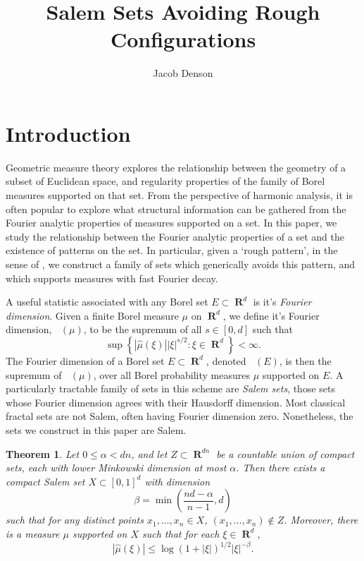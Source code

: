 \documentclass[12pt,reqno]{article}
\title{Salem Sets Avoiding Rough Configurations}
\author{Jacob Denson}
\numberwithin{equation}{section}
\DeclareMathOperator{\fordim}{\dim_{\mathbf{F}}}
\DeclareMathOperator{\RR}{\mathbf{R}}
\newtheorem{theorem}{Theorem}
\begin{document}
\maketitle

\section{Introduction}

Geometric measure theory explores the relationship between the geometry of a subset of Euclidean space, and regularity properties of the family of Borel measures supported on that set. From the perspective of harmonic analysis, it is often popular to explore what structural information can be gathered from the Fourier analytic properties of measures supported on a set. In this paper, we study the relationship between the Fourier analytic properties of a set and the existence of patterns on the set. In particular, given a `rough pattern', in the sense of \cite{OurPaper}, we construct a family of sets which generically avoids this pattern, and which supports measures with fast Fourier decay.

A useful statistic associated with any Borel set $E \subset \RR^d$ is it's \emph{Fourier dimension}. Given a finite Borel measure $\mu$ on $\RR^d$, we define it's Fourier dimension, $\fordim(\mu)$, to be the supremum of all $s \in [0,d]$ such that
%
\begin{equation} \label{fordim}
    \sup \left\{ |\widehat{\mu}(\xi)| |\xi|^{s/2} : \xi \in \RR^d \right\} < \infty.
\end{equation}
%
The Fourier dimension of a Borel set $E \subset \RR^d$, denoted $\fordim(E)$, is then the supremum of $\fordim(\mu)$, over all Borel probability measures $\mu$ supported on $E$. A particularly tractable family of sets in this scheme are \emph{Salem sets}, those sets whose Fourier dimension agrees with their Hausdorff dimension. Most classical fractal sets are not Salem, often having Fourier dimension zero. Nonetheless, the sets we construct in this paper are Salem.

\begin{theorem} \label{maintheorem}
    Let $0 \leq \alpha < dn$, and let $Z \subset \RR^{dn}$ be a countable union of compact sets, each with lower Minkowski dimension at most $\alpha$. Then there exists a compact Salem set $X \subset [0,1]^d$ with dimension
    \[ \beta = \min \left( \frac{nd - \alpha}{n-1}, d \right) \]
    such that for any distinct points $x_1, \dots, x_n \in X$, $(x_1, \dots, x_n) \not \in Z$. Moreover, there is a measure $\mu$ supported on $X$ such that for each $\xi \in \RR^d$,
    \[ |\widehat{\mu}(\xi)| \leq \log(1 + |\xi|)^{1/2} |\xi|^{-\beta}. \]
\end{theorem}
\end{document}
